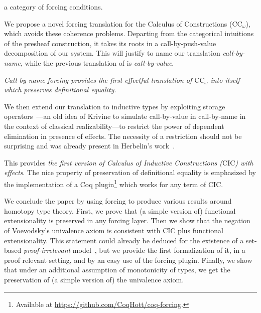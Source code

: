 \documentclass{easychair}
\begin{document}
  a category of forcing conditions. 
  \par
  We propose a novel forcing translation for the Calculus of Constructions (${\mathrm{CC}}_{\omega }$), which avoids these coherence problems. Departing from the categorical intuitions of the presheaf construction, it
  takes its roots in a call-by-push-value \cite{Levy01} decomposition of our system. This will justify to name our translation \emph{call-by-name}, while
  the previous translation of \cite{Jaber12} is \emph{call-by-value}.
  \begin{center}
    \emph{{Call-by-name forcing provides the first effectful translation of ${\mathrm{CC}}_{\omega }$ into itself which preserves definitional equality.}}
  \end{center}
  We then extend our translation to inductive types by exploiting storage operators~\cite{Krivine94}---an old idea of Krivine to simulate call-by-value in call-by-name in the context of classical realizability---to restrict the power of dependent elimination in presence of effects. The necessity of a restriction should not be surprising and was already present in Herbelin's work~\cite{Herbelin12}.
  \par
  This provides \emph{the first version of Calculus of Inductive Constructions ($\mathrm{CIC}$) with effects}. The nice property of preservation of definitional equality is emphasized by the implementation of a Coq plugin\footnote{Available at \url{https://github.com/CoqHott/coq-forcing}.} which works for any term of $\mathrm{CIC}$. 
  \par
  We conclude the paper by using forcing to produce various results around homotopy type theory. First, we prove that (a simple version of) functional extensionality is preserved in any forcing layer. Then we show that the negation of Voevodsky's univalence axiom is consistent with $\mathrm{CIC}$ plus functional extensionality. 
  This statement could already be deduced for the existence of a set-based \emph{proof-irrelevant} model~\cite{Werner97}, but we provide the first formalization of it, in a proof relevant setting, and by an easy use of the forcing plugin. 
   Finally, we show that under an additional assumption of monotonicity of types, we get the preservation of (a simple version of) the univalence axiom.



\end{document}
